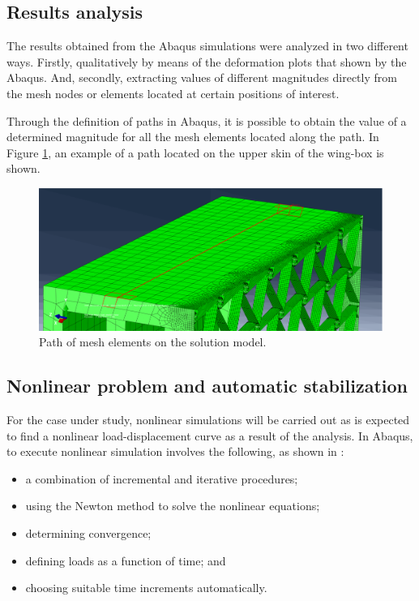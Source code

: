   \subsection{Results analysis} \label{subsec:resultsAnalysis_results_model} %

    The results obtained from the Abaqus simulations were analyzed in two different ways. Firstly, qualitatively by means of the deformation plots that shown by the Abaqus. And, secondly, extracting values of different magnitudes directly from the mesh nodes or elements located at certain positions of interest.

    Through the definition of paths in Abaqus, it is possible to obtain the value of a determined magnitude for all the mesh elements located along the path. In Figure \ref{fig:pathUpper}, an example of a path located on the upper skin of the wing-box is shown.

    \begin{figure}[!htpb]
      \centering
      \includegraphics[width=0.8 \textwidth]{../figures/result-model/pathUpper}
      \caption[Path of mesh elements on the solution model]{Path of mesh elements on the solution model.}\label{fig:pathUpper}
    \end{figure}

  \subsection{Nonlinear problem and automatic stabilization} \label{subsec:nonlinear_results_model} %
    
    For the case under study, nonlinear simulations will be carried out as is expected to find a nonlinear load-displacement curve as a result of the analysis. In Abaqus, to execute nonlinear simulation involves the following, as shown in \cite{Abaqus}:

    \begin{itemize}
      \item a combination of incremental and iterative procedures;
      \item using the Newton method to solve the nonlinear equations;
      \item determining convergence;
      \item defining loads as a function of time; and
      \item choosing suitable time increments automatically.
    \end{itemize}


